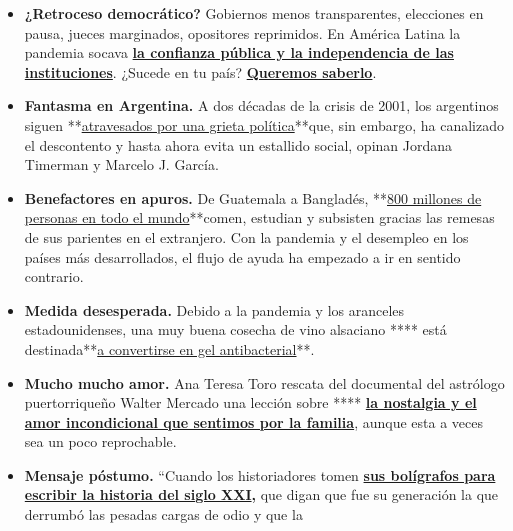 \begin{itemize}
\item
  \textbf{¿Retroceso democrático?} Gobiernos menos transparentes,
  elecciones en pausa, jueces marginados, opositores reprimidos. En
  América Latina la pandemia socava
  \textbf{\href{https://www.nytimes.com/es/2020/07/29/espanol/america-latina/democracia-america-latina-pandemia.html}{la
  confianza pública y la independencia de las instituciones}}. ¿Sucede
  en tu país?
  \textbf{\href{https://www.nytimes.com/es/2020/07/29/espanol/america-latina/democracia-america-latina-pandemia.html\#commentsContainer}{Queremos
  saberlo}}.
\item
  \textbf{Fantasma en Argentina.} A dos décadas de la crisis de 2001,
  los argentinos siguen
  **\href{https://www.nytimes.com/es/2020/07/28/espanol/opinion/argentina-estallido-2001-coronavirus.html}{atravesados
  por una grieta política}**que, sin embargo, ha canalizado el
  descontento y hasta ahora evita un estallido social, opinan Jordana
  Timerman y Marcelo J. García.
\item
  \textbf{Benefactores en apuros.} De Guatemala a Bangladés,
  **\href{https://www.nytimes.com/es/2020/07/28/espanol/mundo/remesas-coronavirus.html}{800
  millones de personas en todo el mundo}**comen, estudian y subsisten
  gracias las remesas de sus parientes en el extranjero. Con la pandemia
  y el desempleo en los países más desarrollados, el flujo de ayuda ha
  empezado a ir en sentido contrario.
\item
  \textbf{Medida desesperada.} Debido a la pandemia y los aranceles
  estadounidenses, una muy buena cosecha de vino alsaciano **** está
  destinada**\href{https://www.nytimes.com/es/2020/07/28/espanol/mundo/vino-blanco-alsacia-coronavirus.html}{a
  convertirse en gel antibacterial}**.
\item
  \textbf{Mucho mucho amor.} Ana Teresa Toro rescata del documental del
  astrólogo puertorriqueño Walter Mercado una lección sobre ****
  \textbf{\href{https://www.nytimes.com/es/2020/07/24/espanol/opinion/walter-mercado-amor-netflix.html}{la
  nostalgia y el amor incondicional que sentimos por la familia}},
  aunque esta a veces sea un poco reprochable.
\item
  \textbf{Mensaje póstumo.} ``Cuando los historiadores tomen
  \textbf{\href{https://www.nytimes.com/es/2020/07/30/espanol/opinion/john-lewis-derechos-civiles.html}{sus
  bolígrafos para escribir la historia del siglo XXI},} que digan que
  fue su generación la que derrumbó las pesadas cargas de odio y que la

\end{itemize}
